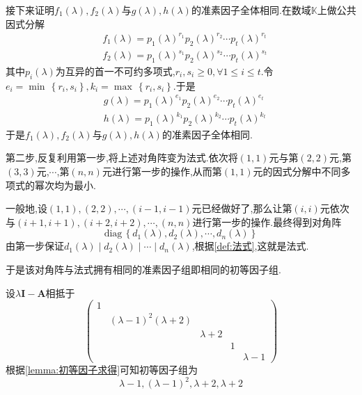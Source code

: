 \begin{green}
\begin{Proof}
接下来证明$f_1\left(\lambda\right),f_2\left(\lambda\right)$与$g\left(\lambda\right),h\left(\lambda\right)$的准素因子全体相同.在数域$\mathbb{K}$上做公共因式分解\begin{align*}
&f_1\left(\lambda\right)=p_1\left(\lambda\right)^{r_1}p_2\left(\lambda\right)^{r_2}\cdots p_t\left(\lambda\right)^{r_t}\\
&f_2\left(\lambda\right)=p_1\left(\lambda\right)^{s_1}p_2\left(\lambda\right)^{s_2}\cdots p_t\left(\lambda\right)^{s_t}
\end{align*}其中$p_i\left(\lambda\right)$为互异的首一不可约多项式,$r_i,s_i\geqslant 0,\forall 1\leqslant i\leqslant t.$令$e_i=\min\,\left\{r_i,s_i\right\},k_i=\max\,\left\{r_i,s_i\right\}.$于是
\begin{align*}
    &g\left(\lambda\right)=p_1\left(\lambda\right)^{e_1}p_2\left(\lambda\right)^{e_2}\cdots p_t\left(\lambda\right)^{e_t}\\
    &h\left(\lambda\right)=p_1\left(\lambda\right)^{k_1}p_2\left(\lambda\right)^{k_2}\cdots p_t\left(\lambda\right)^{k_t}
\end{align*}于是$f_1\left(\lambda\right),f_2\left(\lambda\right)$与$g\left(\lambda\right),h\left(\lambda\right)$的准素因子全体相同.

第二步,反复利用第一步,将上述对角阵变为法式.依次将$\left(1,1\right)$元与第$\left(2,2\right)$元,第$\left(3,3\right)$元,$\cdots$,第$\left(n,n\right)$元进行第一步的操作,从而第$\left(1,1\right)$元的因式分解中不同多项式的幂次均为最小.

一般地,设$\left(1,1\right),\left(2,2\right),\cdots,\left(i-1,i-1\right)$元已经做好了,那么让第$\left(i,i\right)$元依次与$\left(i+1,i+1\right),\left(i+2,i+2\right),\cdots,\left(n,n\right)$进行第一步的操作.最终得到对角阵\[
\mathrm{diag}\,\left\{
    d_1\left(\lambda\right),d_2\left(\lambda\right),\cdots,d_n\left(\lambda\right)
\right\}
\]由第一步保证$d_1\left(\lambda\right)\mid d_2\left(\lambda\right)\mid \cdots\mid d_n\left(\lambda\right)$,根据\cref{def:法式},这就是法式.

于是该对角阵与法式拥有相同的准素因子组即相同的初等因子组.
\end{Proof}
\end{green}
\begin{brown}
\begin{example}
    设$\lambda\bm{I}-\bm{A}$相抵于\[
    \begin{pmatrix}
        1&&&&\\
        &\left(\lambda-1\right)^2\left(\lambda+2\right)&&&\\
        &&\lambda+2&&\\
        &&&1&\\
        &&&&\lambda-1
    \end{pmatrix}
    \]根据\cref{lemma:初等因子求得}可知初等因子组为\[
    \lambda-1,\left(\lambda-1\right)^2,\lambda+2,\lambda+2
    \]
\end{example}
\end{brown}
